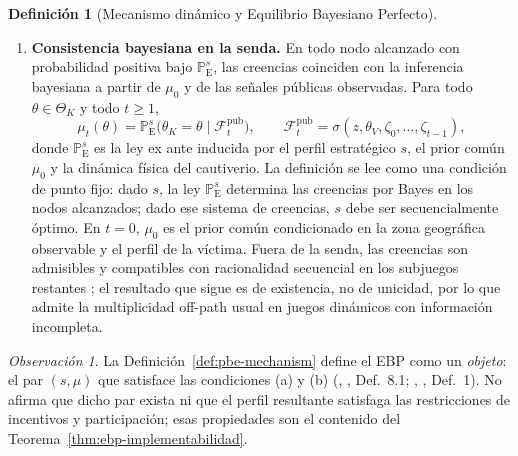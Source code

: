 \documentclass[12pt]{article}
\providecommand{\textcite}{\citet}
\theoremstyle{definition}
\newtheorem{definition}[theorem]{Definición}
\theoremstyle{remark}
\newtheorem{remark}[theorem]{Observación}
\newcommand{\ProbE}{\mathbb{P}_{\mathrm{E}}}
\newcommand{\1}{\mathbf{1}}
\begin{document}
\begin{definition}[Mecanismo dinámico y Equilibrio Bayesiano Perfecto]
\begin{enumerate}
  \item[\textup{(b)}] \textbf{Consistencia bayesiana en la senda.} En todo nodo alcanzado con probabilidad positiva bajo $\ProbE^s$, las creencias coinciden con la inferencia bayesiana a partir de $\mu_0$ y de las señales públicas observadas. Para todo $\theta\in\Theta_K$ y todo $t\ge 1$,
  \begin{equation}
  \label{eq:def712-bayes-mu}
  \mu_t(\theta)=\ProbE^s\!\bigl(\theta_K=\theta\mid \mathcal{F}_t^{\mathrm{pub}}\bigr),
  \qquad
  \mathcal{F}_t^{\mathrm{pub}}=\sigma(z,\theta_V,\zeta_0,\ldots,\zeta_{t-1}),
  \end{equation}
  donde $\ProbE^s$ es la ley ex ante inducida por el perfil estratégico $s$, el prior común $\mu_0$ y la dinámica física del cautiverio. La definición se lee como una condición de punto fijo: dado $s$, la ley $\ProbE^s$ determina las creencias por Bayes en los nodos alcanzados; dado ese sistema de creencias, $s$ debe ser secuencialmente óptimo. En $t=0$, $\mu_0$ es el prior común condicionado en la zona geográfica observable y el perfil de la víctima. Fuera de la senda, las creencias son admisibles y compatibles con racionalidad secuencial en los subjuegos restantes \textcite{FudenbergTirole1991,KrepsWilson1982}; el resultado que sigue es de existencia, no de unicidad, por lo que admite la multiplicidad off-path usual en juegos dinámicos con información incompleta.
\end{enumerate}
\end{definition}

\begin{remark}
La Definición~\ref{def:pbe-mechanism} define el EBP como un \emph{objeto}: el par $(s,\mu)$ que satisface las condiciones \textup{(a)} y \textup{(b)} \textup{(}\citeauthor{FudenbergTirole1991}, \citeyear{FudenbergTirole1991}, Def.~8.1; \citeauthor{KrepsWilson1982}, \citeyear{KrepsWilson1982}, Def.~1\textup{)}. No afirma que dicho par exista ni que el perfil resultante satisfaga las restricciones de incentivos y participación; esas propiedades son el contenido del Teorema~\ref{thm:ebp-implementabilidad}.
\end{remark}
\end{document}
